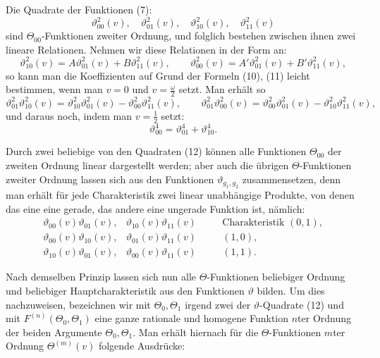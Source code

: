 \documentclass[11pt]{article}
\begin{document}
Die Quadrate der Funktionen (7):
\begin{equation}
\vartheta_{00}^2(v),\quad \vartheta_{01}^2(v),\quad
\vartheta_{10}^2(v),\quad \vartheta_{11}^2(v)
\tag{12}
\end{equation}
sind $\Theta_{00}$-Funktionen zweiter Ordnung, und folglich bestehen zwischen ihnen zwei lineare Relationen. Nehmen wir diese Relationen in der Form an:
\[
\vartheta_{10}^2(v)=A\vartheta_{01}^2(v)+B\vartheta_{11}^2(v),\qquad
\vartheta_{00}^2(v)=A'\vartheta_{01}^2(v)+B'\vartheta_{11}^2(v),
\]
so kann man die Koeffizienten auf Grund der Formeln (10), (11) leicht bestimmen, wenn man $v=0$ und $v=\frac{\omega}{2}$ setzt. Man erhält so
\begin{equation}
\vartheta_{01}^2\vartheta_{10}^2(v)=\vartheta_{10}^2\vartheta_{01}^2(v)-\vartheta_{00}^2\vartheta_{11}^2(v),\qquad
\vartheta_{01}^2\vartheta_{00}^2(v)=\vartheta_{00}^2\vartheta_{01}^2(v)-\vartheta_{10}^2\vartheta_{11}^2(v),
\tag{13}
\end{equation}
und daraus noch, indem man $v=\frac12$ setzt:
\begin{equation}
\vartheta_{00}^4=\vartheta_{01}^4+\vartheta_{10}^4.
\tag{14}
\end{equation}

Durch zwei beliebige von den Quadraten (12) können alle Funktionen $\Theta_{00}$ der zweiten Ordnung linear dargestellt werden; aber auch die übrigen $\Theta$-Funktionen zweiter Ordnung lassen sich aus den Funktionen $\vartheta_{g_1,g_2}$ zusammensetzen, denn man erhält für jede Charakteristik zwei linear unabhängige Produkte, von denen das eine eine gerade, das andere eine ungerade Funktion ist, nämlich:
\begin{equation}
\begin{array}{rcll}
\vartheta_{00}(v)\vartheta_{01}(v),& \vartheta_{10}(v)\vartheta_{11}(v) &\quad& \text{Charakteristik }(0,1),\\
\vartheta_{00}(v)\vartheta_{10}(v),& \vartheta_{01}(v)\vartheta_{11}(v) && (1,0),\\
\vartheta_{10}(v)\vartheta_{01}(v),& \vartheta_{00}(v)\vartheta_{11}(v) && (1,1).
\end{array}
\tag{15}
\end{equation}

Nach demselben Prinzip lassen sich nun alle $\Theta$-Funktionen beliebiger Ordnung und beliebiger Hauptcharakteristik aus den Funktionen $\vartheta$ bilden. Um dies nachzuweisen, bezeichnen wir mit $\Theta_0,\Theta_1$ irgend zwei der $\vartheta$-Quadrate (12) und mit $F^{(n)}(\Theta_0,\Theta_1)$ eine ganze rationale und homogene Funktion $n$ter Ordnung der beiden Argumente $\Theta_0,\Theta_1$. Man erhält hiernach für die $\Theta$-Funktionen $m$ter Ordnung $\Theta^{(m)}(v)$ folgende Ausdrücke:
\end{document}
